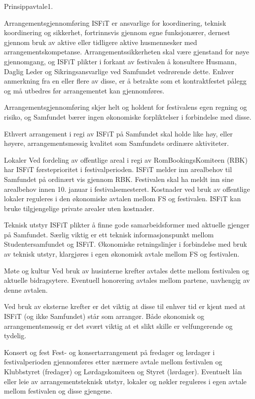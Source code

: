 \begin{instruks}{Prinsippavtale}{1. }{ }
\begin {instruksledd}{Arrangementsgjennomføring}
ISFiT er ansvarlige for koordinering, teknisk koordinering og sikkerhet, fortrinnsvis gjennom egne
funksjonærer, dernest gjennom bruk av aktive eller tidligere aktive husmennesker med
arrangementskompetanse.
Arrangementssikkerheten skal være gjenstand for nøye gjennomgang, og ISFiT plikter i forkant av
festivalen å
konsultere Husmann, Daglig Leder og Sikringsansvarlige ved Samfundet vedrørende dette. Enhver
anmerkning fra en
eller flere av disse, er å betrakte som et kontraktfestet pålegg og må utbedres før arrangementet
kan gjennomføres.

Arrangementsgjennomføring skjer helt og holdent for festivalens egen regning og risiko, og Samfundet
bærer ingen
økonomiske forpliktelser i forbindelse med disse.

Ethvert arrangement i regi av ISFiT på Samfundet skal holde like høy, eller høyere,
arrangementsmessig kvalitet som
Samfundets ordinære aktiviteter.
	  \end {instruksledd}
	  \begin{instruksledd}{Lokaler}
Ved fordeling av offentlige areal i regi av RomBookingsKomiteen (RBK) har ISFiT førsteprioritet i
festivalperioden.
ISFiT melder inn arealbehov til Samfundet på ordinært vis gjennom RBK. Festivalen skal ha meldt inn
sine arealbehov innen 10. januar i festivalsemesteret. Kostnader ved bruk av offentlige lokaler
reguleres i den økonomiske
avtalen mellom FS og festivalen. ISFiT kan bruke tilgjengelige private arealer uten kostnader.
	\end{instruksledd}
	\begin{instruksledd}{Teknisk utstyr}
ISFiT plikter å finne gode samarbeidsformer med aktuelle gjenger på Samfundet. Særlig viktig er ett
teknisk
informasjonspunkt mellom Studentersamfundet og ISFiT. Økonomiske retningslinjer i forbindelse med
bruk av
teknisk utstyr, klargjøres i egen økonomisk avtale mellom FS og festivalen.
	\end{instruksledd}
	\begin{instruksledd}{Møte og kultur}
 Ved bruk av husinterne krefter avtales dette mellom festivalen og aktuelle bidragsytere. Eventuell
honorering avtales
mellom partene, uavhengig av denne avtalen.

Ved bruk av eksterne krefter er det viktig at disse til enhver tid er kjent med at ISFiT (og ikke
Samfundet) står som
arrangør. Både økonomisk og arrangementsmessig er det svært viktig at et slikt skille er
velfungerende og tydelig.
	\end{instruksledd}
	\begin{instruksledd}{Konsert og fest}
Fest- og konsertarrangement på fredager og lørdager i festivalperioden gjennomføres etter nærmere
avtale mellom
festivalen og Klubbstyret (fredager) og Lørdagskomiteen og Styret (lørdager). Eventuelt lån eller
leie av
arrangementsteknisk utstyr, lokaler og nøkler reguleres i egen avtale mellom festivalen og disse
gjengene.


\end{instruksledd}
\end{instruks}
